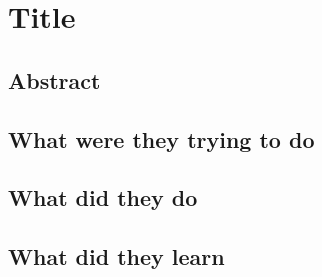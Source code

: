 \section{Title}

\subsection{Abstract}



\subsection{What were they trying to do}



\subsection{What did they do}



\subsection{What did they learn}


